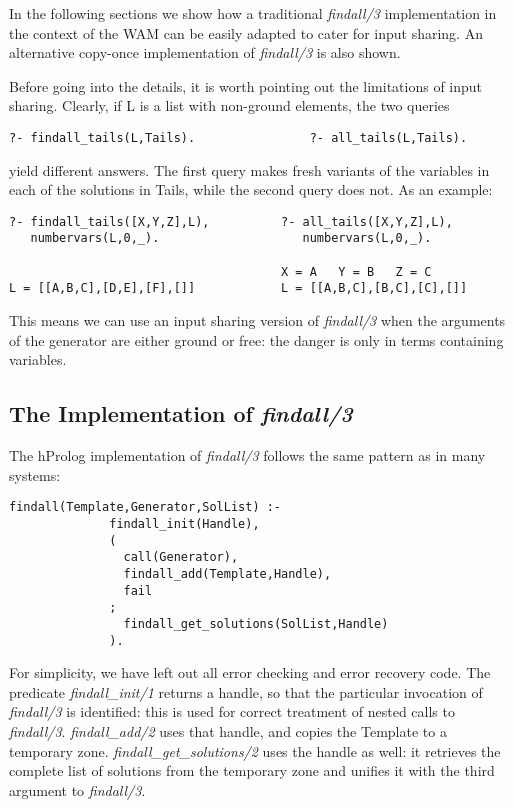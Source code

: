 \documentclass{tlp}
\begin{document}
In the following sections we show how a traditional {\em findall/3}
implementation in the context of the WAM can be easily adapted to
cater for input sharing. An alternative copy-once implementation of
{\em findall/3} is also shown.

Before going into the details, it is worth pointing out the
limitations of input sharing. Clearly, if L is a list with non-ground
elements, the two queries
\begin{Verbatim}[fontsize=\small, frame=single,samepage=true]
  ?- findall_tails(L,Tails).                ?- all_tails(L,Tails).
\end{Verbatim}
yield different answers. The first query makes fresh variants of the
variables in each of the solutions in Tails, while the second query
does not. As an example:

\begin{Verbatim}[fontsize=\small, frame=single,samepage=true]
?- findall_tails([X,Y,Z],L),          ?- all_tails([X,Y,Z],L),
   numbervars(L,0,_).                    numbervars(L,0,_).

                                      X = A   Y = B   Z = C
L = [[A,B,C],[D,E],[F],[]]            L = [[A,B,C],[B,C],[C],[]]
\end{Verbatim}

This means we can use an input sharing version of {\em findall/3} when the
arguments of the generator are either ground or free: the danger is
only in terms containing variables.


\subsection{The Implementation of {\em findall/3}}

The hProlog implementation of {\em findall/3} follows the same pattern as
in many systems:

\begin{Verbatim}[fontsize=\small, frame=single,samepage=true]
       findall(Template,Generator,SolList) :-
              findall_init(Handle),
              (
                call(Generator), 
                findall_add(Template,Handle),
                fail
              ;
                findall_get_solutions(SolList,Handle)
              ).
\end{Verbatim}

For simplicity, we have left out all error checking and error recovery
code. The predicate {\em findall\_init/1} returns a handle, so that the
particular invocation of {\em findall/3} is identified: this is used for
correct treatment of nested calls to {\em findall/3}. {\em findall\_add/2} uses
that handle, and copies the Template to a temporary
zone. {\em findall\_get\_solutions/2} uses the handle as well: it retrieves
the complete list of solutions from the temporary zone and unifies it
with the third argument to {\em findall/3}.
\end{document}
